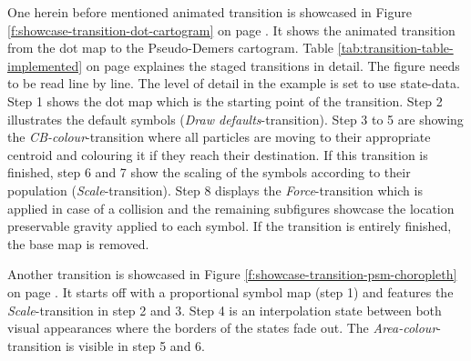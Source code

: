 One herein before mentioned animated transition is showcased in Figure \ref{f:showcase-transition-dot-cartogram} on page \pageref{f:showcase-transition-dot-cartogram}. It shows the animated transition from the dot map to the Pseudo-Demers cartogram. Table \ref{tab:transition-table-implemented} on page \pageref{tab:transition-table-implemented} explaines the staged transitions in detail. The figure needs to be read line by line. The level of detail in the example is set to use state-data. Step 1 shows the dot map which is the starting point of the transition. Step 2 illustrates the default symbols (\textit{Draw defaults}-transition). Step 3 to 5 are showing the \textit{CB-colour}-transition where all particles are moving to their appropriate centroid and colouring it if they reach their destination. If this transition is finished, step 6 and 7 show the scaling of the symbols according to their population (\textit{Scale}-transition). Step 8 displays the \textit{Force}-transition which is applied in case of a collision and the remaining subfigures showcase the location preservable gravity applied to each symbol. If the transition is entirely finished, the base map is removed.

Another transition is showcased in Figure \ref{f:showcase-transition-psm-choropleth} on page \pageref{f:showcase-transition-psm-choropleth}. It starts off with a proportional symbol map (step 1) and features the \textit{Scale}-transition in step 2 and 3. Step 4 is an interpolation state between both visual appearances where the borders of the states fade out. The \textit{Area-colour}-transition is visible in step 5 and 6.

